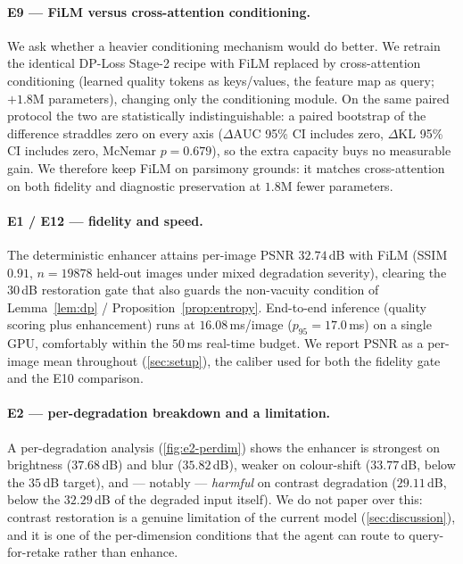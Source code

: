 \paragraph{E9 --- FiLM versus cross-attention conditioning.}
We ask whether a heavier conditioning mechanism would do better. We retrain the identical DP-Loss
Stage-2 recipe with FiLM replaced by cross-attention conditioning (learned quality tokens as
keys/values, the feature map as query; $+1.8$M parameters), changing only the conditioning module. On
the same paired protocol the two are statistically indistinguishable: a paired bootstrap of the
difference straddles zero on every axis ($\Delta\mathrm{AUC}$ 95\% CI includes zero, $\Delta\mathrm{KL}$
95\% CI includes zero, McNemar $p=0.679$), so the extra capacity buys no measurable gain. We therefore
keep FiLM on parsimony grounds: it matches cross-attention on both fidelity and diagnostic preservation
at $1.8$M fewer parameters.

\paragraph{E1 / E12 --- fidelity and speed.}
The deterministic enhancer attains per-image PSNR $32.74$\,dB with FiLM (SSIM $0.91$, $n=19878$
held-out
images under mixed degradation severity), clearing the $30$\,dB restoration gate that also guards the
non-vacuity condition of Lemma~\ref{lem:dp} / Proposition~\ref{prop:entropy}. End-to-end inference
(quality scoring plus enhancement) runs at $16.08$\,ms/image ($p_{95}=17.0$\,ms) on a single GPU,
comfortably within the $50$\,ms real-time budget. We report PSNR as a per-image mean throughout
(\cref{sec:setup}), the caliber used for both the fidelity gate and the E10 comparison.

\paragraph{E2 --- per-degradation breakdown and a limitation.}
A per-degradation analysis (\cref{fig:e2-perdim}) shows the enhancer is strongest on brightness
($37.68$\,dB) and blur ($35.82$\,dB), weaker on colour-shift ($33.77$\,dB, below the $35$\,dB target), and --- notably ---
\emph{harmful} on contrast degradation ($29.11$\,dB, below the $32.29$\,dB of the degraded input
itself). We do not paper over this: contrast restoration is a genuine limitation of the current model
(\cref{sec:discussion}), and it is one of the per-dimension conditions that the agent can route to
query-for-retake rather than enhance.

